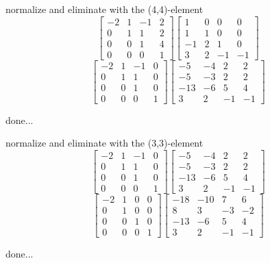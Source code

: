 \documentclass[12pt]{article}
\begin{document}
normalize and eliminate with the (4,4)-element
$$\left[{\begin{array}{cccc}-2& 1& -1& 2\\ 0& 1& 1& 2\\ 0& 0& 1& 4\\ 0& 0& 0& 1\end{array}}\right]\left[{\begin{array}{cccc}1& 0& 0& 0\\ 1& 1& 0& 0\\ -1& 2& 1& 0\\ 3& 2& -1& -1\end{array}}\right]$$
$$\left[{\begin{array}{cccc}-2& 1& -1& 0\\ 0& 1& 1& 0\\ 0& 0& 1& 0\\ 0& 0& 0& 1\end{array}}\right]\left[{\begin{array}{cccc}-5& -4& 2& 2\\ -5& -3& 2& 2\\ -13& -6& 5& 4\\ 3& 2& -1& -1\end{array}}\right]$$
\par\noindent done...


normalize and eliminate with the (3,3)-element
$$\left[{\begin{array}{cccc}-2& 1& -1& 0\\ 0& 1& 1& 0\\ 0& 0& 1& 0\\ 0& 0& 0& 1\end{array}}\right]\left[{\begin{array}{cccc}-5& -4& 2& 2\\ -5& -3& 2& 2\\ -13& -6& 5& 4\\ 3& 2& -1& -1\end{array}}\right]$$
$$\left[{\begin{array}{cccc}-2& 1& 0& 0\\ 0& 1& 0& 0\\ 0& 0& 1& 0\\ 0& 0& 0& 1\end{array}}\right]\left[{\begin{array}{cccc}-18& -10& 7& 6\\ 8& 3& -3& -2\\ -13& -6& 5& 4\\ 3& 2& -1& -1\end{array}}\right]$$
\par\noindent done...
\end{document}
